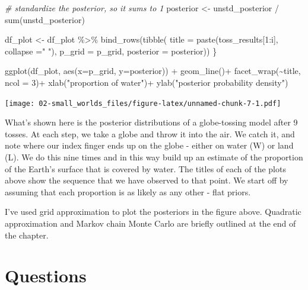 \documentclass[
]{book}
\newenvironment{Shaded}{\begin{snugshade}}{\end{snugshade}}
\newcommand{\AttributeTok}[1]{\textcolor[rgb]{0.77,0.63,0.00}{#1}}
\newcommand{\CommentTok}[1]{\textcolor[rgb]{0.56,0.35,0.01}{\textit{#1}}}
\newcommand{\DecValTok}[1]{\textcolor[rgb]{0.00,0.00,0.81}{#1}}
\newcommand{\FunctionTok}[1]{\textcolor[rgb]{0.00,0.00,0.00}{#1}}
\newcommand{\NormalTok}[1]{#1}
\newcommand{\OtherTok}[1]{\textcolor[rgb]{0.56,0.35,0.01}{#1}}
\newcommand{\SpecialCharTok}[1]{\textcolor[rgb]{0.00,0.00,0.00}{#1}}
\newcommand{\StringTok}[1]{\textcolor[rgb]{0.31,0.60,0.02}{#1}}
\begin{document}
\begin{Shaded}
\begin{Highlighting}[]
  \CommentTok{\# standardize the posterior, so it sums to 1}
\NormalTok{  posterior }\OtherTok{\textless{}{-}}\NormalTok{ unstd\_posterior }\SpecialCharTok{/} \FunctionTok{sum}\NormalTok{(unstd\_posterior)}
  
\NormalTok{  df\_plot }\OtherTok{\textless{}{-}}\NormalTok{ df\_plot }\SpecialCharTok{\%\textgreater{}\%} \FunctionTok{bind\_rows}\NormalTok{(}\FunctionTok{tibble}\NormalTok{(}
                    \AttributeTok{title =} \FunctionTok{paste}\NormalTok{(toss\_results[}\DecValTok{1}\SpecialCharTok{:}\NormalTok{i], }\AttributeTok{collapse =}\StringTok{" "}\NormalTok{),}
                    \AttributeTok{p\_grid =}\NormalTok{ p\_grid,}
                    \AttributeTok{posterior =}\NormalTok{ posterior))}
\NormalTok{\}}

\FunctionTok{ggplot}\NormalTok{(df\_plot, }\FunctionTok{aes}\NormalTok{(}\AttributeTok{x=}\NormalTok{p\_grid, }\AttributeTok{y=}\NormalTok{posterior)) }\SpecialCharTok{+}
  \FunctionTok{geom\_line}\NormalTok{()}\SpecialCharTok{+}
  \FunctionTok{facet\_wrap}\NormalTok{(}\SpecialCharTok{\textasciitilde{}}\NormalTok{title, }\AttributeTok{ncol =} \DecValTok{3}\NormalTok{)}\SpecialCharTok{+}
  \FunctionTok{xlab}\NormalTok{(}\StringTok{"proportion of water"}\NormalTok{)}\SpecialCharTok{+}
  \FunctionTok{ylab}\NormalTok{(}\StringTok{"posterior probability density"}\NormalTok{)}
\end{Highlighting}
\end{Shaded}

\texttt{[image: 02-small\_worlds\_files/figure-latex/unnamed-chunk-7-1.pdf]}

What's shown here is the posterior distributions of a globe-tossing model after 9 tosses. At each step, we take a globe and throw it into the air. We catch it, and note where our index finger ends up on the globe - either on water (W) or land (L). We do this nine times and in this way build up an estimate of the proportion of the Earth's surface that is covered by water. The titles of each of the plots above show the sequence that we have observed to that point. We start off by assuming that each proportion is as likely as any other - flat priors.

I've used grid approximation to plot the posteriors in the figure above. Quadratic approximation and Markov chain Monte Carlo are briefly outlined at the end of the chapter.

\hypertarget{questions-1}{%
\section{Questions}\label{questions-1}}
\end{document}
